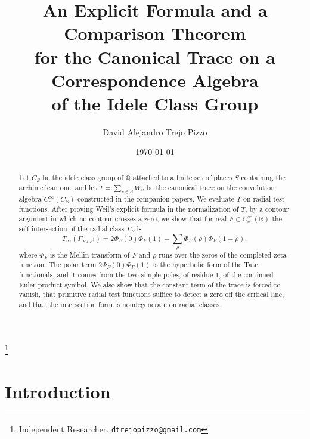 \documentclass[11pt]{amsart}
\theoremstyle{definition}
\theoremstyle{remark}
\newcommand{\R}{\mathbb R}
\newcommand{\Q}{\mathbb Q}
\begin{document}
\title[An explicit formula and a comparison theorem for a canonical trace]
{An Explicit Formula and a Comparison Theorem\\
for the Canonical Trace on a Correspondence Algebra\\
of the Idele Class Group}

\author{David Alejandro Trejo Pizzo}
\thanks{Independent Researcher. \texttt{dtrejopizzo@gmail.com}}

\date{\today}

\begin{abstract}
Let $C_S$ be the idele class group of $\Q$ attached to a finite set of places
$S$ containing the archimedean one, and let $T=\sum_{v\in S}W_v$ be the
canonical trace on the convolution algebra $C_c^\infty(C_S)$ constructed in
the companion papers.  We evaluate $T$ on radial test functions.  After
proving Weil's explicit formula in the normalization of $T$, by a contour
argument in which no contour crosses a zero, we show that for real
$F\in C_c^\infty(\R)$ the self-intersection of the radial class $\Gamma_F$ is
\[
  T_\infty(\Gamma_{F\star F^\dagger})
  =2\Phi_F(0)\Phi_F(1)-\sum_\rho\Phi_F(\rho)\Phi_F(1-\rho),
\]
where $\Phi_F$ is the Mellin transform of $F$ and $\rho$ runs over the zeros
of the completed zeta function.  The polar term $2\Phi_F(0)\Phi_F(1)$ is the
hyperbolic form of the Tate functionals, and it comes from the two simple
poles, of residue $1$, of the continued Euler-product symbol.  We also show
that the constant term of the trace is forced to vanish, that primitive
radial test functions suffice to detect a zero off the critical line, and
that the intersection form is nondegenerate on radial classes.
\end{abstract}

\maketitle

\tableofcontents

\section{Introduction}
\label{sec:intro}
\end{document}
